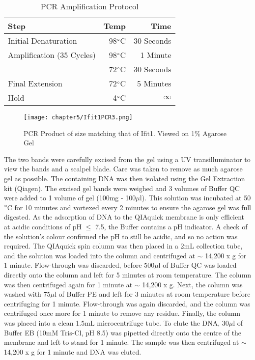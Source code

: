 \begin{table}[!htbp]
\centering
\begin{tabular}{lrr}
  
  Step                          & Temp                      & Time        \\
  \hline
  Initial Denaturation          & 98$\degree$C              & 30 Seconds  \\
  Amplification (35 Cycles)     & 98$\degree$C              & 1 Minute    \\
                                & 72$\degree$C              & 30 Seconds  \\
  Final Extension               & 72$\degree$C              & 5 Minutes   \\
  Hold                          & 4$\degree$C               & $\infty$    \\
\end{tabular}
\caption{PCR Amplification Protocol}
\label{tab:PCRtimings}
\end{table}

\begin{figure*}[!htbp]
\centering
\texttt{[image: chapter5/Ifit1PCR3.png]}
\caption{PCR Product of size matching that of Ifit1. Viewed on 1\% Agarose Gel}
\label{fig:ifit1PCR}
\end{figure*}

The two bands were carefully excised from the gel using a UV transilluminator to view the bands and a scalpel blade. Care was taken to remove as much agarose gel as possible. The containing DNA was then isolated using the Gel Extraction kit (Qiagen). The excised gel bands were weighed and 3 volumes of Buffer QC were added to 1 volume of gel (100mg - 100$\mu$l). This solution was incubated at 50$\degree$C for 10 minutes and vortexed every 2 minutes to ensure the agarose gel was full digested. As the adsorption of DNA to the QIAquick membrane is only efficient at acidic conditions of pH $\leq$ 7.5, the Buffer contains a pH indicator. A check of the solution’s colour confirmed the pH to still be acidic, and so no action was required. The QIAquick spin column was then placed in a 2mL collection tube, and the solution was loaded into the column and centrifuged at $\sim$ 14,200 x g for 1 minute. Flow-through was discarded, before 500$\mu$l of Buffer QC was loaded directly onto the column and left for 5 minutes at room temperature. The column was then centrifuged again for 1 minute at $\sim$ 14,200 x g. Next, the column was washed with 75$\mu$l of Buffer PE and left for 3 minutes at room temperature before centrifuging for 1 minute. Flow-through was again discarded, and the column was centrifuged once more for 1 minute to remove any residue. Finally, the column was placed into a clean 1.5mL microcentrifuge tube. To elute the DNA, 30$\mu$l of Buffer EB (10mM Tris-Cl, pH 8.5) was pipetted directly onto the centre of the membrane and left to stand for 1 minute. The sample was then centrifuged at $\sim$ 14,200 x g for 1 minute and DNA was eluted. 

